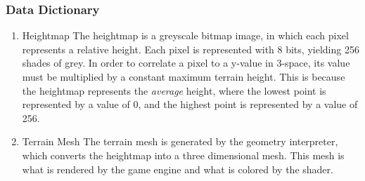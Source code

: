 \subsubsection{Data Dictionary}
\begin{enumerate}
\item{Heightmap}
The heightmap is a greyscale bitmap image, in which each pixel represents a relative height. 
Each pixel is represented with 8 bits, yielding 256 shades of grey. 
In order to correlate a pixel to a y-value in 3-space, its value must be multiplied by a constant maximum terrain height. 
This is because the heightmap represents the \textit{average} height, where the lowest point is represented by a value of 0, and the highest point is represented by a value of 256.
\item{Terrain Mesh}
The terrain mesh is generated by the geometry interpreter, which converts the heightmap into a three dimensional mesh. This mesh is what is rendered by the game engine and what is colored by the shader.
\end{enumerate}

